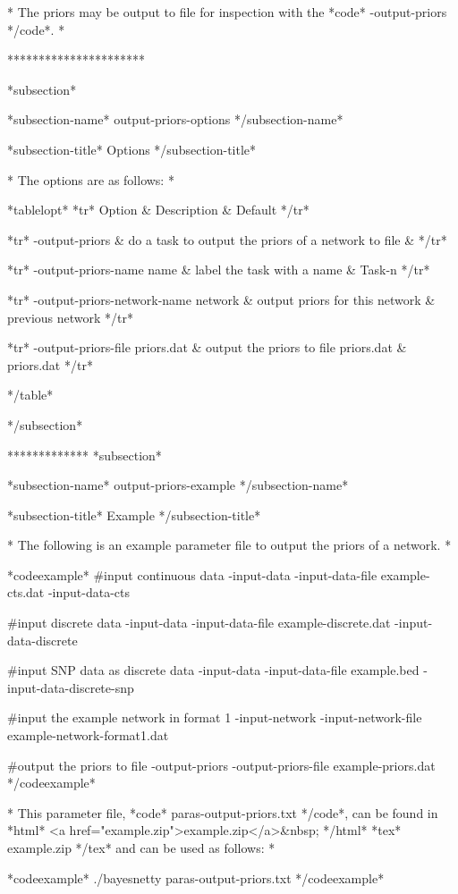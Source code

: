 * The priors may be output to file for inspection with the *code* -output-priors */code*. *

**********************

*subsection*

*subsection-name* output-priors-options */subsection-name*

*subsection-title* Options */subsection-title*

* The options are as follows: *

*tablelopt* *tr* Option & Description & Default */tr*

*tr*
 -output-priors  & do a task to output the priors of a network to file &
*/tr*

*tr*
  -output-priors-name name & label the task with a name & Task-n
*/tr*

*tr*
  -output-priors-network-name network & output priors for this network & previous network
*/tr*

*tr*
  -output-priors-file priors.dat & output the priors to file priors.dat & priors.dat
*/tr*

*/table*

*/subsection*

************* *subsection*

*subsection-name* output-priors-example */subsection-name*

*subsection-title* Example */subsection-title*


* The following is an example parameter file to output the priors of a network. *

*codeexample* #input continuous data -input-data -input-data-file example-cts.dat -input-data-cts

#input discrete data -input-data -input-data-file example-discrete.dat -input-data-discrete

#input SNP data as discrete data -input-data -input-data-file example.bed -input-data-discrete-snp

#input the example network in format 1 -input-network -input-network-file example-network-format1.dat

#output the priors to file -output-priors -output-priors-file example-priors.dat */codeexample*

* This parameter file, *code* paras-output-priors.txt */code*, can be found in *html* <a href="example.zip">example.zip</a>&nbsp; */html* *tex* example.zip */tex* and can be used as follows: *

*codeexample* ./bayesnetty paras-output-priors.txt */codeexample*

